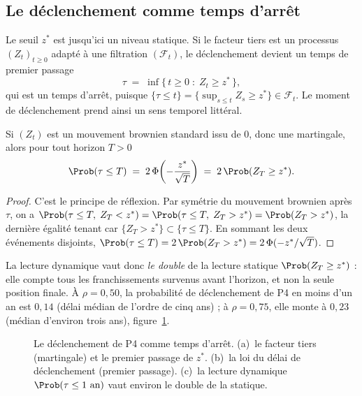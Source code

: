 \subsection{Le déclenchement comme temps d'arrêt}
\label{sec:p4-dynamique}

Le seuil $z^*$ est jusqu'ici un niveau statique. Si le facteur tiers est un processus
$(Z_t)_{t\ge0}$ adapté à une filtration $(\mathcal{F}_t)$, le déclenchement devient un
temps de premier passage
\begin{equation}
  \tau \;=\; \inf\{\,t\ge 0 \;:\; Z_t \ge z^*\,\},
  \label{eq:temps-arret}
\end{equation}
qui est un temps d'arrêt, puisque $\{\tau\le t\}=\{\sup_{s\le t}Z_s\ge z^*\}\in
\mathcal{F}_t$. Le \og{}moment\fg{} de déclenchement prend ainsi un sens temporel littéral.

\begin{proposition}\label{prop:premier-passage}
Si $(Z_t)$ est un mouvement brownien standard issu de $0$, donc une martingale, alors pour tout
horizon $T>0$
\begin{equation}
  \Prob(\tau\le T) \;=\; 2\,\Phi\!\left(-\frac{z^*}{\sqrt{T}}\right)
  \;=\; 2\,\Prob(Z_T\ge z^*).
  \label{eq:reflexion}
\end{equation}
\end{proposition}

\begin{proof}
C'est le principe de réflexion. Par symétrie du mouvement brownien après $\tau$, on a
$\Prob(\tau\le T,\;Z_T< z^*)=\Prob(\tau\le T,\;Z_T> z^*)=\Prob(Z_T>z^*)$, la dernière égalité
tenant car $\{Z_T>z^*\}\subset\{\tau\le T\}$. En sommant les deux événements disjoints,
$\Prob(\tau\le T)=2\,\Prob(Z_T>z^*)=2\,\Phi(-z^*/\sqrt{T})$.
\end{proof}

La lecture dynamique vaut donc \emph{le double} de la lecture statique $\Prob(Z_T\ge z^*)$ : elle
compte tous les franchissements survenus avant l'horizon, et non la seule position finale. À
$\rho=0{,}50$, la probabilité de déclenchement de P4 en moins d'un an est $0{,}14$ (délai médian
de l'ordre de cinq ans) ; à $\rho=0{,}75$, elle monte à $0{,}23$ (médian d'environ trois ans),
figure~\ref{fig:p4-dynamique}.

\begin{figure}[htbp]\centering
{}
\caption{Le déclenchement de P4 comme temps d'arrêt. (a)~le facteur tiers (martingale)
et le premier passage de $z^*$. (b)~la loi du délai de déclenchement (premier passage).
(c)~la lecture dynamique $\Prob(\tau\le 1\text{ an})$ vaut environ le double de la
statique.}
\label{fig:p4-dynamique}
\end{figure}

